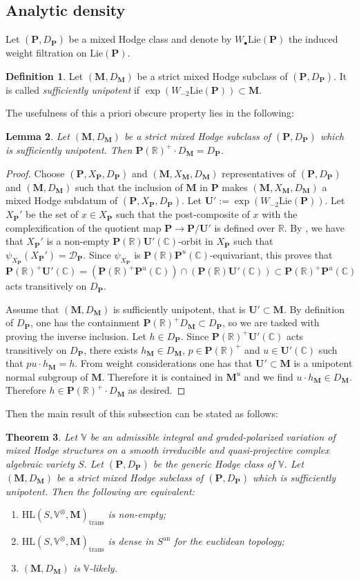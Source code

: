 \documentclass[10pt]{article}
\numberwithin{equation}{subsection}
\theoremstyle{plain}
\newtheorem{theorem}{Theorem}[section]
\newtheorem{lemma}[theorem]{Lemma}
\theoremstyle{definition}
\newtheorem{definition}[theorem]{Definition}
\theoremstyle{remark}
\newcommand{\lie}{\mathrm{Lie}}
\newcommand{\C}{\mathbb C}
\newcommand{\R}{\mathbb R}
\newcommand{\V}{\mathbb V}
\newcommand{\pp}{\mathbf P}
\newcommand{\uu}{\mathbf U}
\newcommand{\M}{\mathbf M}
\newcommand{\HLM}{\mathrm{HL}(S, \V^\otimes, \M)}
\newcommand{\bul}{\bullet}
\newcommand{\an}{\mathrm{an}}
\newcommand{\trans}{\mathrm{trans}}
\begin{document}
\subsection{Analytic density}
Let $(\pp, D_\pp)$ be a mixed Hodge class and denote by $W_\bul \lie(\pp)$ the induced weight filtration on $\lie(\pp)$.
\begin{definition}
Let $(\M,D_\M)$ be a strict mixed Hodge subclass of $(\pp, D_\pp)$. It is called \textit{sufficiently unipotent} if $\exp(W_{-2}\lie(\pp)) \subset \M$.
\end{definition}
The usefulness of this a priori obscure property lies in the following:
\begin{lemma}\label{sufuncrit}
Let $(\M,D_\M)$ be a strict mixed Hodge subclass of $(\pp,D_\pp)$ which is sufficiently unipotent. Then $\pp(\R)^+\cdot D_\M = D_\pp$.
\end{lemma}
\begin{proof}
Choose $(\pp, X_\pp, D_\pp)$ and $(\M, X_\M, D_\M)$ representatives of $(\pp, D_\pp)$ and $(\M,D_\M)$ such that the inclusion of $\M$ in $\pp$ makes $(\M,X_\M, D_\M)$ a mixed Hodge subdatum of $(\pp, X_\pp, D_\pp)$. Let $\uu' := \exp(W_{-2}\lie(\pp))$. Let $X_\pp'$ be the set of $x \in X_\pp$ such that the post-composite of $x$ with the complexification of the quotient map $\pp \rightarrow \pp/\uu'$ is defined over $\R$. By \cite[Prop. 1.16]{pinkthese}, we have that $X_\pp'$ is a non-empty $\pp(\R)\uu'(\C)$-orbit in $X_\pp$ such that $\psi_{X_\pp}(X_\pp') = \mathcal{D}_\pp$. Since $\psi_{X_\pp}$ is $\pp(\R)\pp^u(\C)$-equivariant, this proves that \[\pp(\R)^+\uu'(\C) = (\pp(\R)^+\pp^u(\C)) \cap (\pp(\R)\uu'(\C)) \subset \pp(\R)^+\pp^u(\C)\] acts transitively on $D_\pp$.

Assume that $(\M,D_\M)$ is sufficiently unipotent, that is $\uu' \subset \M$. By definition of $D_\pp$, one has the containment $\pp(\R)^+ D_\M \subset D_\pp$, so we are tasked with proving the inverse inclusion. Let $h \in D_\pp$. Since $\pp(\R)^+ \uu'(\C)$ acts transitively on $D_\pp$, there exists $h_\M \in D_\M$, $p \in \pp(\R)^+$ and $u \in \uu'(\C)$ such that $pu \cdot h_\M = h$. From weight considerations one has that $\uu' \subset \M$ is a unipotent normal subgroup of $\M$. Therefore it is contained in $\M^u$ and we find $u \cdot h_\M \in D_\M$. Therefore $h \in \pp(\R)^+ \cdot D_\M$ as desired.
\end{proof}
Then the main result of this subsection can be stated as follows:
\begin{theorem}\label{mainprescribed}
Let $\V$ be an admissible integral and graded-polarized variation of mixed Hodge structures on a smooth irreducible and quasi-projective complex algebraic variety $S$. Let $(\pp, D_\pp)$ be the generic Hodge class of $\V$.  Let $(\M, D_\M)$ be a strict mixed Hodge subclass of $(\pp, D_\pp)$ which is sufficiently unipotent. Then the following are equivalent:
\begin{enumerate}
\item[(i)] $\HLM_\trans$ is non-empty;
\item[(ii)] $\HLM_\trans$ is dense in $S^\an$ for the euclidean topology;
\item[(iii)] $(\M,D_\M)$ is $\V$-likely.
\end{enumerate}
\end{theorem}
\end{document}
